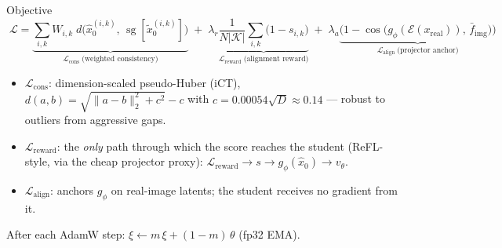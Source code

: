 \documentclass[aspectratio=169,10pt]{beamer}
\newcommand{\sg}{\operatorname{sg}}
\newcommand{\cossim}{\operatorname{cos}}
\newcommand{\xhat}{\hat{x}_0}
\newcommand{\xtil}{\tilde{x}_0}
\newcommand{\fimg}{\bar{f}_{\mathrm{img}}}
\begin{document}
\begin{frame}{Objective}
  \small
  \[
  \boxed{\;
  \mathcal{L} =
  \underbrace{\sum_{i,k} W_{i,k}\;
    d\big( \xhat^{(i,k)},\, \sg[\xtil^{(i,k)}] \big)}_{\mathcal{L}_{\mathrm{cons}}\;\text{(weighted consistency)}}
  \;+\; \lambda_r
  \underbrace{\frac{1}{N |\mathcal{K}|} \sum_{i,k} \big( 1 - s_{i,k} \big)}_{\mathcal{L}_{\mathrm{reward}}\;\text{(alignment reward)}}
  \;+\; \lambda_a
  \underbrace{\Big( 1 - \cossim\big( g_\phi(\mathcal{E}(x_{\mathrm{real}})),\, \fimg \big) \Big)}_{\mathcal{L}_{\mathrm{align}}\;\text{(projector anchor)}}
  \;}
  \]
  \normalsize
  \begin{itemize}
    \item $\mathcal{L}_{\mathrm{cons}}$: dimension-scaled pseudo-Huber (iCT),
      $d(a,b) = \sqrt{\lVert a - b \rVert_2^2 + c^2} - c$ with
      $c = 0.00054\sqrt{D} \approx 0.14$ --- robust to outliers from
      aggressive gaps.
    \item $\mathcal{L}_{\mathrm{reward}}$: the \emph{only} path through which
      the score reaches the student (ReFL-style, via the cheap projector
      proxy): $\mathcal{L}_{\mathrm{reward}} \to s \to g_\phi(\xhat) \to v_\theta$.
    \item $\mathcal{L}_{\mathrm{align}}$: anchors $g_\phi$ on real-image
      latents; the student receives no gradient from it.
  \end{itemize}
  After each AdamW step: $\xi \leftarrow m\,\xi + (1-m)\,\theta$ (fp32 EMA).
\end{frame}
\end{document}
